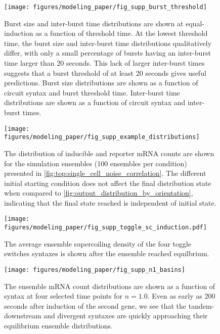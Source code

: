 \documentclass[11pt]{article}
\begin{document}
\begin{figure}[hbtp]
    \centering
    {\texttt{[image: figures/modeling\_paper/fig\_supp\_burst\_threshold]}
    \label{fig:burst_threshold_burst_size}
    \label{fig:burst_threshold_interburst_time}
    }
    \caption{Burst size and inter-burst time distributions are shown at equal-induction as a function of threshold time. At the lowest threshold time, the burst size and inter-burst time distributions qualitatively differ, with only a small percentage of bursts having an inter-burst time larger than 20 seconds. This lack of larger inter-burst times suggests that a burst threshold of at least 20 seconds gives useful predictions.
         Burst size distributions are shown as a function of circuit syntax and burst threshold time.
         Inter-burst time distributions are shown as a function of circuit syntax and inter-burst times.
    }
    \label{fig:top:burst_threshold}
\end{figure}

\begin{figure}[hbtp]
    \centering
    \texttt{[image: figures/modeling\_paper/fig\_supp\_example\_distributions]}
    \caption{The distribution of inducible and reporter mRNA counts are shown for the simulation ensembles (100 ensembles per condition) presented in \cref{fig:top:single_cell_noise_correlation}. The different initial starting condition does not affect the final distribution state when compared to \cref{fig:output_distribution_by_orientation}, indicating that the final state reached is independent of initial state.}
    \label{fig:supp:fig_examples_ensemble_behavior}
\end{figure}

\begin{figure}[hbtp]
    \centering
    \texttt{[image: figures/modeling\_paper/fig\_supp\_toggle\_sc\_induction.pdf]}
    \caption{The average ensemble supercoiling density of the four toggle switches syntaxes is shown after the ensemble reached equilbrium.}
    \label{fig:supp:toggles_sc_density}
\end{figure}

\begin{figure}[hbtp]
    \centering
    \texttt{[image: figures/modeling\_paper/fig\_supp\_n1\_basins]}
    \caption{The ensemble mRNA count distributions are shown as a function of syntax at four selected time points for \(n = 1.0\). Even as early as 200 seconds after induction of the second gene, we see that the tandem-downstream and divergent syntaxes are quickly approaching their equilibrium ensemble distributions.}
    \label{fig:supp:n1_toggle_distributions}
\end{figure}
\end{document}
